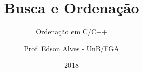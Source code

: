 \title{Busca e Ordenação}
\subtitle{Ordenação em C/C++}
\author{Prof. Edson Alves - UnB/FGA}
\date{2018}
